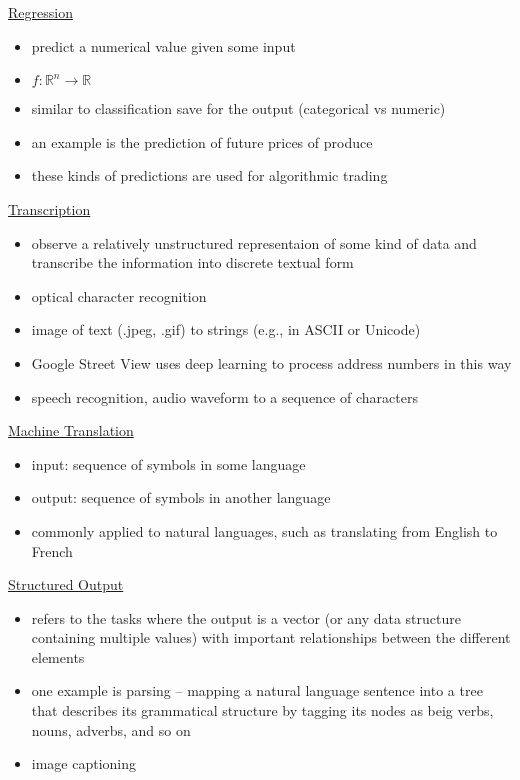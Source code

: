 \documentclass[11pt, twocolumn]{report}
\def\realnumbers{\mathbb{R}}
\begin{document}
\underline{Regression}
\begin{itemize}
  \item predict a numerical value given some input
  \item $f : \realnumbers^n \to \realnumbers$
  \item similar to classification save for the output (categorical vs numeric)
  \item an example is the prediction of future prices of produce
  \item these kinds of predictions are used for algorithmic trading
\end{itemize}

\underline{Transcription}
\begin{itemize}
  \item observe a relatively unstructured representaion of some kind of data
    and transcribe the information into discrete textual form
  \item optical character recognition
  \item image of text (.jpeg, .gif) to strings (e.g., in ASCII or Unicode)
  \item Google Street View uses deep learning to process address numbers in
    this way
  \item speech recognition, audio waveform to a sequence of characters 
\end{itemize}

\underline{Machine Translation}
\begin{itemize}
  \item input: sequence of symbols in some language
  \item output: sequence of symbols in another language
  \item commonly applied to natural languages, such as translating from English
    to French
\end{itemize}

\underline{Structured Output}
\begin{itemize}
  \item refers to the tasks where the output is a vector (or any data structure
    containing multiple values) with important relationships between the
    different elements
  \item one example is parsing -- mapping a natural language sentence into a
    tree that describes its grammatical structure by tagging its nodes as beig
    verbs, nouns, adverbs, and so on
  \item image captioning
\end{itemize}
\end{document}
